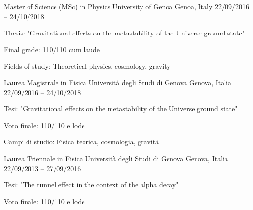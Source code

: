 \begin{cventries}
\ifenglish
\cventry
{Master of Science (MSc) in Physics} %
{University of Genoa} %
{Genoa, Italy} %
{22/09/2016 -- 24/10/2018} %
{ %
\begin{cvitems}
  \item {Thesis: "Gravitational effects on the metastability of the Universe ground state"}
  \item {Final grade: 110/110 cum laude}
  \item {Fields of study: Theoretical physics, cosmology, gravity}
\end{cvitems}
}
\else
\cventry
{Laurea Magistrale in Fisica} %
{Università degli Studi di Genova} %
{Genova, Italia} %
{22/09/2016 -- 24/10/2018} %
{ %
\begin{cvitems}
    \item {Tesi: "Gravitational effects on the metastability of the Universe ground state"}
    \item {Voto finale: 110/110 e lode}
    \item {Campi di studio: Fisica teorica, cosmologia, gravità}
\end{cvitems}
}
\fi



\cventry
{Laurea Triennale in Fisica} %
{Università degli Studi di Genova} %
{Genova, Italia} %
{22/09/2013 -- 27/09/2016} %
{ %
\begin{cvitems}
\item {Tesi: "The tunnel effect in the context of the alpha decay"}
\item {Voto finale: 110/110 e lode}
\end{cvitems}
}


\end{cventries}